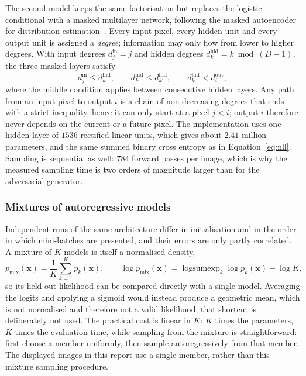 \documentclass[11pt,a4paper]{article}
\begin{document}
The second model keeps the same factorisation but replaces the logistic conditional with a
masked multilayer network, following the masked autoencoder for distribution
estimation~\parencite{made2015}. Every input pixel, every hidden unit and every output unit is
assigned a \emph{degree}; information may only flow from lower to higher degrees.
With input degrees $d^{\text{in}}_j=j$ and hidden degrees $d^{\text{hid}}_k = k \bmod (D-1)$,
the three masked layers satisfy
\begin{equation}
  d^{\text{in}}_j \le d^{\text{hid}}_k,
  \qquad
  d^{\text{hid}}_k \le d^{\text{hid}}_{k'},
  \qquad
  d^{\text{hid}}_k < d^{\text{out}}_i,
  \label{eq:made-masks}
\end{equation}
where the middle condition applies between consecutive hidden layers.
Any path from an input pixel to output $i$ is a chain of non-decreasing degrees that ends with
a strict inequality, hence it can only start at a pixel $j<i$; output $i$ therefore never
depends on the current or a future pixel.
The implementation uses one hidden layer of $1536$ rectified linear units, which gives about
$2.41$ million parameters, and the same summed binary cross entropy as in
Equation~\ref{eq:nll}.
Sampling is sequential as well: $784$ forward passes per image, which is why the measured
sampling time is two orders of magnitude larger than for the adversarial generator.

\subsubsection{Mixtures of autoregressive models}

Independent runs of the same architecture differ in initialisation and in the order in which
mini-batches are presented, and their errors are only partly correlated.
A mixture of $K$ models is itself a normalised density,
\begin{equation}
  p_{\text{mix}}(\mathbf{x}) = \frac{1}{K}\sum_{k=1}^{K} p_k(\mathbf{x}),
  \qquad
  \log p_{\text{mix}}(\mathbf{x}) = \operatorname{logsumexp}_k \log p_k(\mathbf{x}) - \log K,
  \label{eq:mixture}
\end{equation}
so its held-out likelihood can be compared directly with a single model.
Averaging the logits and applying a sigmoid would instead produce a geometric mean, which is
not normalised and therefore not a valid likelihood; that shortcut is deliberately not used.
The practical cost is linear in $K$: $K$ times the parameters, $K$ times the evaluation time,
while sampling from the mixture is straightforward: first choose a member uniformly, then
sample autoregressively from that member. The displayed images in this report use a single
member, rather than this mixture sampling procedure.
\end{document}
